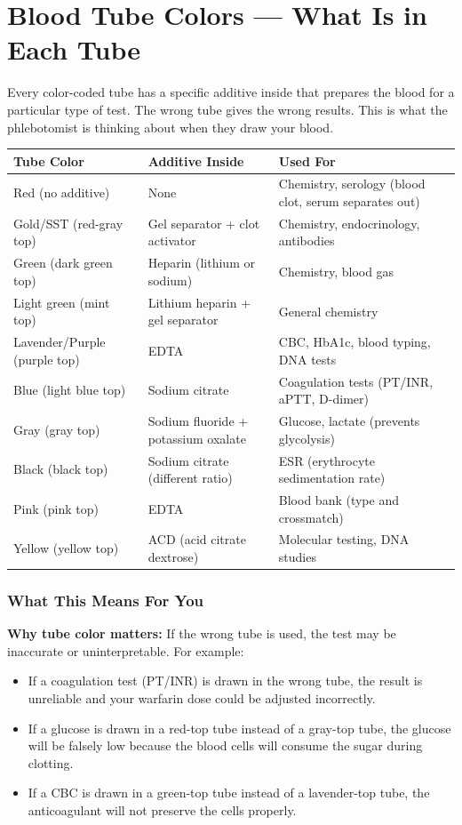 \clearpage
\section{Blood Tube Colors --- What Is in Each Tube}

Every color-coded tube has a specific additive inside that prepares the blood for a particular type of test. The wrong tube gives the wrong results. This is what the phlebotomist is thinking about when they draw your blood.

\begin{longtable}{@{}p{3.2cm}p{4.2cm}p{5.5cm}@{}}
\toprule
\textbf{Tube Color} & \textbf{Additive Inside} & \textbf{Used For} \\
\midrule
Red (no additive) & None & Chemistry, serology (blood clot, serum separates out) \\
Gold/SST (red-gray top) & Gel separator + clot activator & Chemistry, endocrinology, antibodies \\
Green (dark green top) & Heparin (lithium or sodium) & Chemistry, blood gas \\
Light green (mint top) & Lithium heparin + gel separator & General chemistry \\
Lavender/Purple (purple top) & EDTA & CBC, HbA1c, blood typing, DNA tests \\
Blue (light blue top) & Sodium citrate & Coagulation tests (PT/INR, aPTT, D-dimer) \\
Gray (gray top) & Sodium fluoride + potassium oxalate & Glucose, lactate (prevents glycolysis) \\
Black (black top) & Sodium citrate (different ratio) & ESR (erythrocyte sedimentation rate) \\
Pink (pink top) & EDTA & Blood bank (type and crossmatch) \\
Yellow (yellow top) & ACD (acid citrate dextrose) & Molecular testing, DNA studies \\
\bottomrule
\end{longtable}

\subsubsection{What This Means For You}

\textbf{Why tube color matters:} If the wrong tube is used, the test may be inaccurate or uninterpretable. For example:
\begin{itemize}
    \item If a coagulation test (PT/INR) is drawn in the wrong tube, the result is unreliable and your warfarin dose could be adjusted incorrectly.
    \item If a glucose is drawn in a red-top tube instead of a gray-top tube, the glucose will be falsely low because the blood cells will consume the sugar during clotting.
    \item If a CBC is drawn in a green-top tube instead of a lavender-top tube, the anticoagulant will not preserve the cells properly.
\end{itemize}

